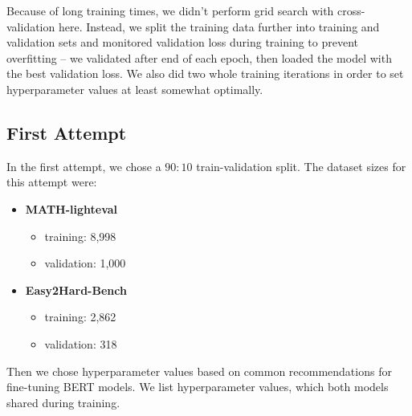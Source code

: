 \documentclass[runningheads]{llncs}
\begin{document}
Because of long training times, we didn't perform grid search with cross-validation here. Instead, we split the training data further into training and validation sets and monitored validation loss during training to prevent overfitting -- we validated after end of each epoch, then loaded the model with the best validation loss. We also did two whole training iterations in order to set hyperparameter values at least somewhat optimally.

\subsection{First Attempt}

In the first attempt, we chose a $90:10$ train-validation split. The dataset sizes for this attempt were:

\begin{itemize}
    \item \textbf{MATH-lighteval}
    \begin{itemize}
        \item training: 8{,}998
        \item validation: 1{,}000
    \end{itemize}

\vspace{10pt}

    \item \textbf{Easy2Hard-Bench}
    \begin{itemize}
        \item training: 2{,}862
        \item validation: 318
    \end{itemize}
\end{itemize}

Then we chose hyperparameter values based on common recommendations for fine-tuning BERT models. We list hyperparameter values, which both models shared during training.
\end{document}
